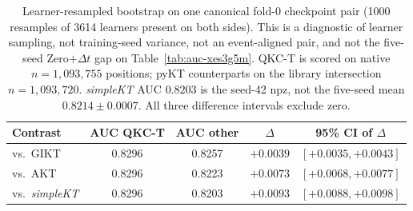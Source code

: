 \begin{table}[H]
\caption{Learner-resampled bootstrap on one canonical fold-0 checkpoint
pair (1000 resamples of 3614 learners present on both sides). This is a
diagnostic of learner sampling, not training-seed variance, not an
event-aligned pair, and not the
five-seed Zero$+\Delta t$ gap on Table~\ref{tab:auc-xes3g5m}.
QKC-T is scored on
native $n{=}1{,}093{,}755$ positions; pyKT counterparts on the
library intersection $n{=}1{,}093{,}720$. \textit{simpleKT} AUC
$0.8203$ is the seed-42 npz, not the five-seed mean $0.8214{\pm}0.0007$.
All three difference intervals exclude zero.}
\label{tab:bootstrap-qkct}
\centering
\footnotesize
\begin{tabular}{@{}lcccc@{}}
\toprule
Contrast & AUC QKC-T & AUC other & $\Delta$ & 95\% CI of $\Delta$ \\
\midrule
vs.\ GIKT & 0.8296 & 0.8257 & $+0.0039$ & $[+0.0035,+0.0043]$ \\
vs.\ AKT & 0.8296 & 0.8223 & $+0.0073$ & $[+0.0068,+0.0077]$ \\
vs.\ \textit{simpleKT} & 0.8296 & 0.8203 & $+0.0093$ & $[+0.0088,+0.0098]$ \\
\bottomrule
\end{tabular}
\end{table}
